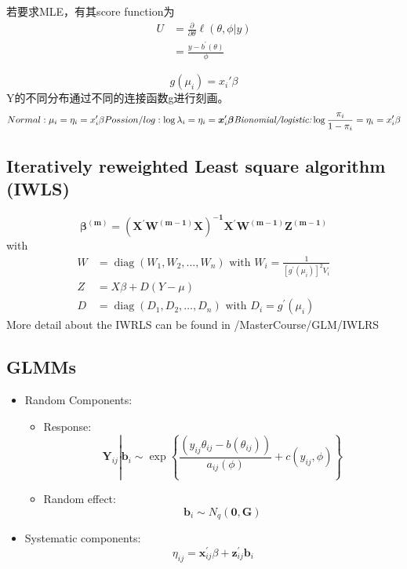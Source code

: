 \documentclass[
]{book}
\providecommand{\tightlist}{%
  \setlength{\itemsep}{0pt}\setlength{\parskip}{0pt}}
\theoremstyle{definition}
\theoremstyle{definition}
\theoremstyle{definition}
\theoremstyle{remark}
\begin{document}
若要求MLE，有其score function为
\[
\begin{aligned} U &=\frac{\partial}{\partial \theta} \ell(\theta, \phi | y) \\ &=\frac{y-b^{\prime}(\theta)}{\phi} \end{aligned}
\]

\[
g(\mu_i)=x_i'\beta
\]
Y的不同分布通过不同的连接函数g进行刻画。
\[
Normal: \mu_i=\eta_i=x_i'\beta\\
Possion/log: \log \lambda_{i}=\eta_{i}=\boldsymbol{x}_{i}^{\prime} \boldsymbol{\beta}\\
\textit{Bionomial/logistic:}\log \frac{\pi_{i}}{1-\pi_{i}}=\eta_{i}=x_{i}^{\prime} \beta
\]

\hypertarget{iteratively-reweighted-least-square-algorithm-iwls}{%
\subsection{Iteratively reweighted Least square algorithm (IWLS)}\label{iteratively-reweighted-least-square-algorithm-iwls}}

\[
\boldsymbol{\beta}^{(\boldsymbol{m})}=\left(\boldsymbol{X}^{\prime} \boldsymbol{W}^{(\boldsymbol{m}-\mathbf{1})} \boldsymbol{X}\right)^{-\mathbf{1}} \boldsymbol{X}^{\prime} \boldsymbol{W}^{(\boldsymbol{m}-\mathbf{1})} \boldsymbol{Z}^{(\boldsymbol{m}-\mathbf{1})}
\]
with
\[
\begin{aligned} W &=\operatorname{diag}\left(W_{1}, W_{2}, \ldots, W_{n}\right) \text { with } W_{i}=\frac{1}{\left[g^{\prime}\left(\mu_{i}\right)\right]^{2} V_{i}} \\ Z &=X \beta+D(Y-\mu) \\ D &=\operatorname{diag}\left(D_{1}, D_{2}, \ldots, D_{n}\right) \text { with } D_{i}=g^{\prime}\left(\mu_{i}\right) \end{aligned}
\]
More detail about the IWRLS can be found in /MasterCourse/GLM/IWLRS

\hypertarget{glmms}{%
\subsection{GLMMs}\label{glmms}}

\begin{itemize}
\tightlist
\item
  Random Components:

  \begin{itemize}
  \item
    Response:
    \[
    \mathbf{Y}_{i j}\left|\mathbf{b}_{i} \sim \exp \left\{\frac{\left(y_{i j} \theta_{i j}-b\left(\theta_{i j}\right)\right)}{a_{i j}(\phi)}+c\left(y_{i j}, \phi\right)\right\}\right.
    \]
  \item
    Random effect:
    \[
    \mathbf{b}_{i} \sim N_{q}(\mathbf{0}, \mathbf{G})
    \]
  \end{itemize}
\item
  Systematic components:
  \[
  \eta_{i j}=\mathbf{x}_{i j}^{\prime} \beta+\mathbf{z}_{i j}^{\prime} \mathbf{b}_{i}
  \]
\end{itemize}
\end{document}
